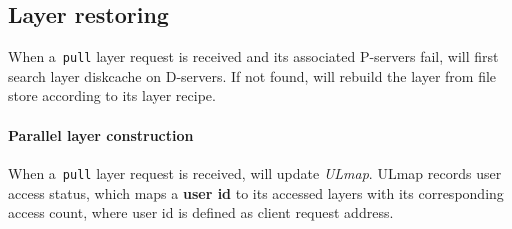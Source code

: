 
\subsection{Layer restoring}
\label{sec:restore-desgin}



When a~\texttt{pull} layer request is received and its associated 
P-servers fail, 
\sysname will first search layer diskcache on D-servers.
If not found,
\sysname will rebuild the layer from file store according to its layer recipe. 

\paragraph{Parallel layer construction}

When a~\texttt{pull} layer request is received, 
\sysname will update \emph{ULmap}. 
ULmap records user access status,
which maps a \textbf{user id} to its accessed layers with its corresponding access count,
where user id is defined as client request address.

